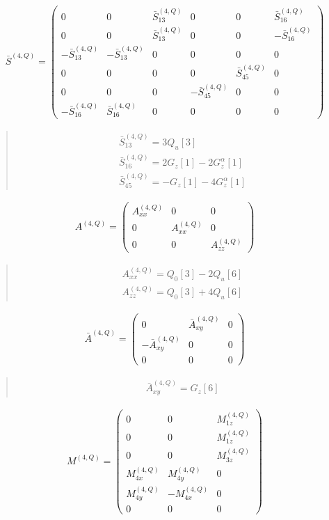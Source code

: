 \documentclass[fleqn,10pt]{jsarticle}
\begin{document}
\begin{align*}
\bar{S}^{(4,Q)} = \begin{pmatrix} 0 & 0 & \bar{S}^{(4,Q)}_{13} & 0 & 0 & \bar{S}^{(4,Q)}_{16} \\ 0 & 0 & \bar{S}^{(4,Q)}_{13} & 0 & 0 & - \bar{S}^{(4,Q)}_{16} \\ - \bar{S}^{(4,Q)}_{13} & - \bar{S}^{(4,Q)}_{13} & 0 & 0 & 0 & 0 \\ 0 & 0 & 0 & 0 & \bar{S}^{(4,Q)}_{45} & 0 \\ 0 & 0 & 0 & - \bar{S}^{(4,Q)}_{45} & 0 & 0 \\ - \bar{S}^{(4,Q)}_{16} & \bar{S}^{(4,Q)}_{16} & 0 & 0 & 0 & 0 \end{pmatrix}
\end{align*}
\begin{quote}
\begin{align*}
& \bar{S}^{(4,Q)}_{13} = 3 Q_{u}[3] \\
& \bar{S}^{(4,Q)}_{16} = 2 G_{z}[1] - 2 G_{z}^{\alpha}[1] \\
& \bar{S}^{(4,Q)}_{45} = - G_{z}[1] - 4 G_{z}^{\alpha}[1]
\end{align*}
\end{quote}
\begin{align*}
A^{(4,Q)} = \begin{pmatrix} A^{(4,Q)}_{xx} & 0 & 0 \\ 0 & A^{(4,Q)}_{xx} & 0 \\ 0 & 0 & A^{(4,Q)}_{zz} \end{pmatrix}
\end{align*}
\begin{quote}
\begin{align*}
& A^{(4,Q)}_{xx} = Q_{0}[3] - 2 Q_{u}[6] \\
& A^{(4,Q)}_{zz} = Q_{0}[3] + 4 Q_{u}[6]
\end{align*}
\end{quote}
\begin{align*}
\bar{A}^{(4,Q)} = \begin{pmatrix} 0 & \bar{A}^{(4,Q)}_{xy} & 0 \\ - \bar{A}^{(4,Q)}_{xy} & 0 & 0 \\ 0 & 0 & 0 \end{pmatrix}
\end{align*}
\begin{quote}
\begin{align*}
& \bar{A}^{(4,Q)}_{xy} = G_{z}[6]
\end{align*}
\end{quote}
\begin{align*}
M^{(4,Q)} = \begin{pmatrix} 0 & 0 & M^{(4,Q)}_{1z} \\ 0 & 0 & M^{(4,Q)}_{1z} \\ 0 & 0 & M^{(4,Q)}_{3z} \\ M^{(4,Q)}_{4x} & M^{(4,Q)}_{4y} & 0 \\ M^{(4,Q)}_{4y} & - M^{(4,Q)}_{4x} & 0 \\ 0 & 0 & 0 \end{pmatrix}
\end{align*}
\end{document}

